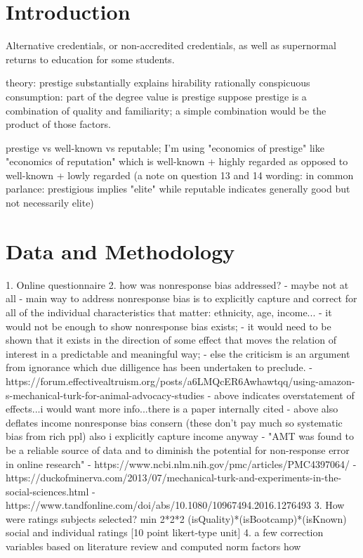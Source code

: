 \documentclass[review]{elsarticle}
\begin{document}
\pagebreak
\linenumbers

\section{Introduction}


Alternative credentials, or non-accredited credentials,
as well as supernormal returns to education for some students.


theory: prestige substantially explains hirability
rationally conspicuous consumption: part of the degree value is prestige
suppose prestige is a combination of quality and familiarity; a simple combination would be the product of those factors.

prestige vs well-known vs reputable; I'm using "economics of prestige" like "economics of reputation"
which is well-known + highly regarded
as opposed to well-known + lowly regarded
(a note on question 13 and 14 wording:
in common parlance: prestigious implies "elite" while reputable indicates generally good but not necessarily elite)

\section{Data and Methodology}

1. Online questionnaire
2. how was nonresponse bias addressed? - maybe not at all
- main way to address nonresponse bias is to explicitly capture and correct for all of the individual characteristics that matter: ethnicity, age, income...
- it would not be enough to show nonresponse bias exists;
- it would need to be shown that it exists in the direction of some effect that moves the relation of interest in a predictable and meaningful way;
- else the criticism is an argument from ignorance which due dilligence has been undertaken to preclude.
- https://forum.effectivealtruism.org/posts/a6LMQcER6Awhawtqq/using-amazon-s-mechanical-turk-for-animal-advocacy-studies
- above indicates overstatement of effects...i would want more info...there is a paper internally cited
- above also deflates income nonresponse bias consern (these don't pay much so systematic bias from rich ppl) also i explicitly capture income anyway
- "AMT was found to be a reliable source of data and to diminish the potential for non-response error in online research"
- https://www.ncbi.nlm.nih.gov/pmc/articles/PMC4397064/
- https://duckofminerva.com/2013/07/mechanical-turk-and-experiments-in-the-social-sciences.html
- https://www.tandfonline.com/doi/abs/10.1080/10967494.2016.1276493
3. How were ratings subjects selected? min 2*2*2 (isQuality)*(isBootcamp)*(isKnown) social and individual ratings [10 point likert-type unit]
4. a few correction variables based on literature review and computed norm factors how
\end{document}
